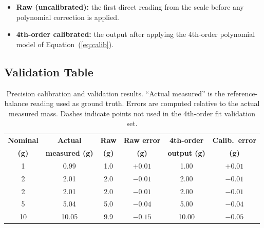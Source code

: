 \documentclass[12pt,a4paper]{article}
\begin{document}
\begin{itemize}
  \item \textbf{Raw (uncalibrated):} the first direct reading from the scale before any
        polynomial correction is applied.
  \item \textbf{4th-order calibrated:} the output after applying the 4th-order
        polynomial model of Equation~(\ref{eq:calib}).
\end{itemize}

\subsection{Validation Table}

\begin{table}[H]
\centering
\caption{Precision calibration and validation results. ``Actual measured'' is the
         reference-balance reading used as ground truth. Errors are computed relative
         to the actual measured mass. Dashes indicate points not used in the 4th-order
         fit validation set.}
\label{tab:validation}
\begin{tabular}{@{}
  S[table-figures-integer=3, table-figures-decimal=0, table-sign-mantissa=false]
  S[table-figures-integer=3, table-figures-decimal=2, table-sign-mantissa=false]
  S[table-figures-integer=3, table-figures-decimal=1, table-sign-mantissa=false]
  S[table-figures-integer=1, table-figures-decimal=2, table-sign-mantissa=true]
  S[table-figures-integer=3, table-figures-decimal=2, table-sign-mantissa=false]
  S[table-figures-integer=1, table-figures-decimal=2, table-sign-mantissa=true]
  @{}}
\toprule
{\textbf{Nominal}} & {\textbf{Actual}} & {\textbf{Raw}} &
{\textbf{Raw error}} & {\textbf{4th-order}} & {\textbf{Calib.\ error}} \\
{\textbf{(g)}} & {\textbf{measured (g)}} & {\textbf{(g)}} &
{\textbf{(g)}} & {\textbf{output (g)}} & {\textbf{(g)}} \\
  &   0.99 &   1.0 & {$+0.01$} &   1.00 & {$+0.01$} \\
    2  &   2.01 &   2.0 & {$-0.01$} &   2.00 & {$-0.01$} \\
    2  &   2.01 &   2.0 & {$-0.01$} &   2.00 & {$-0.01$} \\
    5  &   5.04 &   5.0 & {$-0.04$} &   5.00 & {$-0.04$} \\
   10  &  10.05 &   9.9 & {$-0.15$} &  10.00 & {$-0.05$} \\

\end{tabular}
\end{table}
\end{document}
